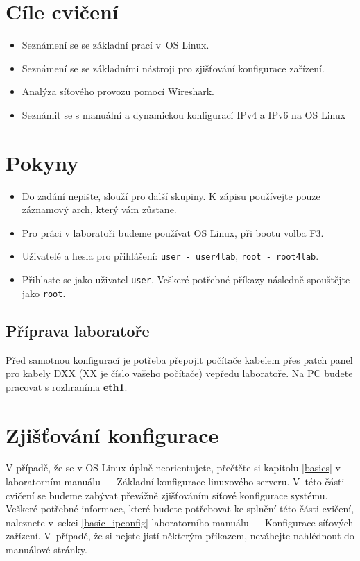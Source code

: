 \section*{Cíle cvičení}
\begin{itemize}
	\item Seznámení se se základní prací v~OS Linux.
	\item Seznámení se se základními nástroji pro zjišťování konfigurace zařízení.
	\item Analýza síťového provozu pomocí Wireshark.
	\item Seznámit se s manuální a dynamickou konfigurací IPv4 a IPv6 na OS Linux
\end{itemize}

\section*{Pokyny}
\begin{itemize}
\item Do zadání nepište, slouží pro další skupiny. K zápisu používejte pouze záznamový arch, který vám zůstane.
\item Pro práci v laboratoři budeme používat OS Linux, při bootu volba F3.
\item Uživatelé a hesla pro přihlášení: \texttt{user - user4lab}, \texttt{root - root4lab}.
\item Přihlaste se jako uživatel \texttt{user}. Veškeré potřebné příkazy následně spouštějte jako \texttt{root}.
\end{itemize}

\subsection*{Příprava laboratoře}
Před samotnou konfigurací je potřeba přepojit počítače kabelem přes patch panel
pro kabely DXX (XX je číslo vašeho počítače) vepředu laboratoře. Na PC budete
pracovat s rozhraníma {\bf eth1}.

\section{Zjišťování konfigurace}
V případě, že se v OS Linux úplně neorientujete, přečtěte si kapitolu \ref{basics} v
laboratorním manuálu --- Základní konfigurace linuxového serveru. V~této části cvičení se
budeme zabývat převážně zjišťováním síťové konfigurace systému. Veškeré potřebné
informace, které budete potřebovat ke splnění této části cvičení, naleznete
v~sekci \ref{basic_ipconfig} laboratorního manuálu --- Konfigurace síťových zařízení. V~případě, že si nejste jistí některým příkazem, neváhejte nahlédnout do manuálové stránky.


